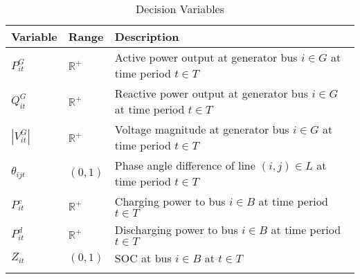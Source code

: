 \begin{longtable}{llp{8cm}}
\toprule
Variable & Range & Description \\
\midrule
$P_{it}^G$ & $\mathbb R^+$ & Active power output at generator bus $i \in G$ at time period $t \in T$\\[1em]
$Q_{it}^G$ & $\mathbb R^+$ & Reactive power output at generator bus $i \in G$ at time period $t \in T$\\[1em]
$|V_{it}^G|$ & $\mathbb R^+$ & Voltage magnitude at generator bus $i \in G$ at time period $t \in T$\\[1em]
$\theta_{ijt}$ & $(0,1)$ & Phase angle difference  of line $(i,j) \in L$ at time period $t \in T$\\[1em]
$P_{it}^{c}$ & $\mathbb R^+$ & Charging power to bus $i \in B$ at time period $t \in T$\\[1em]
$P_{it}^{d}$ & $\mathbb R^+$ & Discharging power to bus $i \in B$ at time period $t \in T$\\[1em]
$Z_{it}$ & $(0,1)$ & \gls{SOC} at bus $i \in B$ at $t \in T$\\
\bottomrule
\caption{Decision Variables}\label{tab:decision variables}
\end{longtable}

